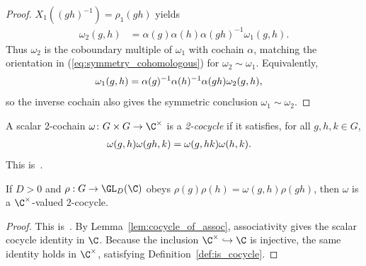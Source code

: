\begin{proof}
    $X_1((gh)^{-1})=\rho_1(gh)$ yields
    \begin{align}
        \omega_2(g,h)
         & =\alpha(g)\alpha(h)\alpha(gh)^{-1}\omega_1(g,h).
        \label{eq:symmetry_gauge_coboundary}
    \end{align}
    Thus $\omega_2$ is the coboundary multiple of $\omega_1$ with cochain
    $\alpha$, matching the orientation in
    (\ref{eq:symmetry_cohomologous}) for $\omega_2\sim\omega_1$. Equivalently,
    \begin{align}
        \omega_1(g,h)
         & =\alpha(g)^{-1}\alpha(h)^{-1}\alpha(gh)\omega_2(g,h),
        \notag
    \end{align}
    so the inverse cochain also gives the symmetric conclusion
    $\omega_1\sim\omega_2$.
\end{proof}

\begin{definition}\label{def:is_cocycle}
    \leanok
    A scalar 2-cochain $\omega \colon G \times G \to \C^{\times}$ is a
    \emph{2-cocycle} if it satisfies, for all $g,h,k \in G$,
    \begin{align}
        \omega(g,h) \omega(gh,k)
         & =\omega(g,hk) \omega(h,k).
        \notag
    \end{align}
    This is~\cite[``Multiplicative 2-cocycle condition'']{QICLean2026Blueprint}.
\end{definition}

\begin{lemma}
    \label{thm:is_cocycle_of_projective_rep}
    \leanok
    If $D>0$ and $\rho:G\to\GL_D(\C)$ obeys
    $\rho(g)\rho(h)=\omega(g,h)\rho(gh)$, then $\omega$ is a
    $\C^\times$-valued $2$-cocycle.
\end{lemma}

\begin{proof}\leanok
    This is~\cite[``A projective factor system is a
        cocycle'']{QICLean2026Blueprint}.
    By Lemma~\ref{lem:cocycle_of_assoc}, associativity gives the scalar
    cocycle identity in $\C$.  Because the inclusion
    $\C^\times\hookrightarrow\C$ is injective, the same identity holds in
    $\C^\times$, satisfying Definition~\ref{def:is_cocycle}.
\end{proof}


